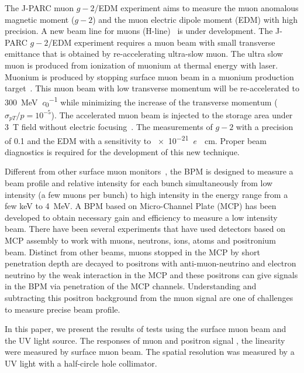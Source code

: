 \documentclass[preprint,3p,twocolumn]{elsarticle}
\begin{document}
The J-PARC muon $g-2$/EDM experiment \cite{E34} aims to measure the muon anomalous magnetic moment ($g-2$) and the muon electric dipole moment (EDM) with high precision.
A new beam line for muons (H-line)~\cite{h-line} is under development.
The J-PARC $g-2$/EDM experiment requires a muon beam with small transverse emittance that is obtained by re-accelerating ultra-slow muon. %
The ultra slow muon is produced from ionization of muonium at thermal energy with laser.
Muonium is produced by stopping surface muon beam in a muonium production target~\cite{muonium}.  
This muon beam with low transverse momentum will be re-accelerated to \SI{300}{\MeV\per\clight} \cite{IH} while minimizing the increase of the transverse momentum ($\sigma_{pT}/p = 10^{-5}$).
The accelerated muon beam is injected to the storage area under \SI{3}{\tesla} field without electric focusing~\cite{injection}. 
The measurements of $g-2$ with a precision of \SI{0.1}{\ppm} and the EDM with a sensitivity to \SI{e-21}{\elementarycharge \cdot \cm}. 
Proper beam diagnostics is required for the development of this new technique.

Different from other surface muon monitors~\cite{muon_bpm1, muon_bpm3}, the BPM is designed to measure a beam profile 
and relative intensity for each bunch simultaneously from low intensity (a few muons per bunch) to high intensity in the energy range from a few \si{keV} to \SI{4}{\MeV}.
A BPM based on Micro-Channel Plate (MCP) has been developed to obtain necessary gain and efficiency to measure a low intensity beam.
There have been several experiments that have used detectors based on MCP assembly to work with muons, neutrons, ions, atoms and positronium~\cite{muon_bpm2, neutron, Ps} beam.
Distinct from other beams, muons stopped in the MCP by short penetration depth are decayed to positrons with anti-muon-neutrino and electron neutrino by the weak interaction in the MCP and these positrons can give signals in the BPM via penetration of the MCP channels. 
Understanding and subtracting this positron background from the muon signal are one of challenges to measure precise beam profile. %

In this paper, we present the results of tests using the surface muon beam and the UV light source.
The responses of muon and positron signal %
, the linearity %
were measured by surface muon beam.
The spatial resolution was measured by a UV light with a half-circle hole collimator.
\end{document}
